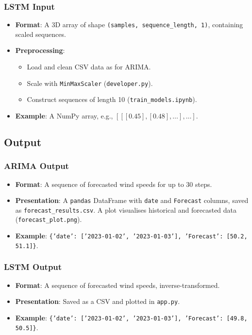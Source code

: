 \subsubsection{LSTM Input}
\begin{itemize}
	\item \textbf{Format}: A 3D array of shape \texttt{(samples, sequence\_length, 1)}, containing scaled sequences.
	\item \textbf{Preprocessing}:
	\begin{itemize}
		\item Load and clean CSV data as for ARIMA.
		\item Scale with \texttt{MinMaxScaler} (\texttt{developer.py}).
		\item Construct sequences of length 10 (\texttt{train\_models.ipynb}).
	\end{itemize}
	\item \textbf{Example}: A NumPy array, e.g., \([[[0.45], [0.48], \ldots], \ldots]\).
\end{itemize}

\subsection{Output}
\subsubsection{ARIMA Output}
\begin{itemize}
	\item \textbf{Format}: A sequence of forecasted wind speeds for up to 30 steps.
	\item \textbf{Presentation}: A \texttt{pandas} DataFrame with \texttt{date} and \texttt{Forecast} columns, saved as \texttt{forecast\_results.csv}. A plot visualises historical and forecasted data (\texttt{forecast\_plot.png}).
	\item \textbf{Example}: \texttt{\{'date': ['2023-01-02', '2023-01-03'], 'Forecast': [50.2, 51.1]\}}.
\end{itemize}

\subsubsection{LSTM Output}
\begin{itemize}
	\item \textbf{Format}: A sequence of forecasted wind speeds, inverse-transformed.
	\item \textbf{Presentation}: Saved as a CSV and plotted in \texttt{app.py}.
	\item \textbf{Example}: \texttt{\{'date': ['2023-01-02', '2023-01-03'], 'Forecast': [49.8, 50.5]\}}.
\end{itemize}

